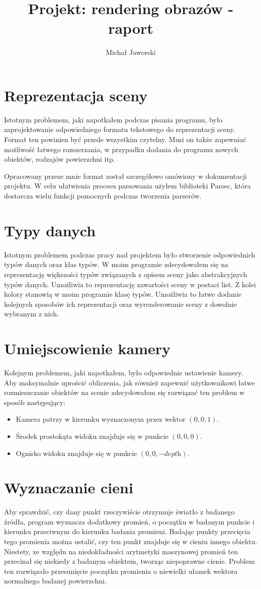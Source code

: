 \documentclass[11pt,a4paper]{article}
\title{\vspace{-2.0cm}\textbf{Projekt: rendering obrazów - raport}}
\author{Michał Jaworski}
\begin{document}
\maketitle
\section{Reprezentacja sceny}
Istotnym problemem, jaki napotkałem podczas pisania programu, było zaprojektowanie odpowiedniego formatu tekstowego do reprezentacji sceny. Format ten powinien być przede wszystkim czytelny. Musi on także zapewniać możliwość łatwego rozszerzania, w przypadku dodania do programu nowych obiektów, rodzajów powierzchni itp.

Opracowany przeze mnie format został szczegółowo omówiony w dokumentacji projektu. W celu ułatwienia procesu parsowania użyłem biblioteki Parsec, która dostarcza wielu funkcji pomocnych podczas tworzenia parserów.
\section{Typy danych}
Istotnym problemem podczas pracy nad projektem było stworzenie odpowiednich typów danych oraz klas typów. W moim programie zdecydowałem się na reprezentację większości typów związanych z opisem sceny jako abstrakcyjnych typów danych. Umożliwia to reprezentację zawartości sceny w postaci list. Z kolei kolory stanowią w moim programie klasę typów. Umożliwia to łatwe dodanie kolejnych sposobów ich reprezentacji oraz wyrenderowanie sceny z dowolnie wybranym z nich.
\section{Umiejscowienie kamery}
Kolejnym problemem, jaki napotkałem, było odpowiednie ustawienie kamery. Aby maksymalnie uprościć obliczenia, jak również zapewnić użytkownikowi łatwe rozmieszczanie obiektów na scenie zdecydowałem się rozwiązać ten problem w sposób następujący:
\begin{itemize}
\item Kamera patrzy w kierunku wyznaczonym przez wektor $(0, 0, 1)$.
\item Środek prostokąta widoku znajduje się w punkcie $(0, 0, 0)$.
\item Ognisko widoku znajduje się w punkcie $(0, 0, -\textit{depth})$.
\end{itemize}
\section{Wyznaczanie cieni}
Aby sprawdzić, czy dany punkt rzeczywiście otrzymuje światło z badanego źródła, program wyznacza dodatkowy promień, o początku w badanym punkcie i kierunku przeciwnym do kierunku badania promieni. Badając punkty przecięcia tego promienia można ustalić, czy ten punkt znajduje się w cieniu innego obiektu. Niestety, ze względu na niedokładności arytmetyki maszynowej promień ten przecinał się niekiedy z badanym obiektem, tworząc niepoprawne cienie. Problem ten rozwiązało przesunięcie początku promienia o niewielki ułamek wektora normalnego badanej powierzchni.
\end{document}
